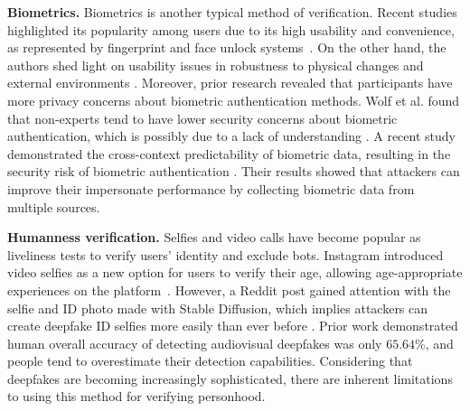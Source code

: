 \textbf{Biometrics.}
Biometrics is another typical method of verification. Recent studies highlighted its popularity among users due to its high usability and convenience, as represented by fingerprint and face unlock systems~\cite{mare2016study, De-Luca2015-mp, Bhagavatula2015-fi, Zimmermann2017-wr}. %
On the other hand, the authors shed light on usability issues in robustness to physical changes %
and external environments %
\cite{mare2016study, Bhagavatula2015-fi}. Moreover, prior research revealed that participants have more privacy concerns about biometric authentication methods\cite{Zimmermann2017-wr}. %
Wolf et al. found that non-experts tend to have lower security concerns about biometric authentication, which is possibly due to a lack of understanding \cite{Wolf2019-od}. A recent study demonstrated the cross-context predictability of biometric data, resulting in the security risk of biometric authentication \cite{Eberz2018-eg}. Their results showed that attackers can improve their impersonate performance by collecting biometric data from multiple sources. 

\textbf{Humanness verification.}
Selfies and video calls have become popular %
as liveliness tests to verify users' identity and exclude bots. 
Instagram introduced video selfies as a new option for users to verify their age, allowing age-appropriate experiences on the platform~\cite{instagramWaysVerify}. However, 
a Reddit post gained attention with the selfie and ID photo made with Stable Diffusion, which implies attackers can create deepfake ID selfies more easily than ever before \cite{techcrunchGenAICould}. Prior work \cite{hashmi2024unmasking} demonstrated human overall accuracy of detecting audiovisual deepfakes was only $65.64$\%, and people tend to overestimate their detection capabilities. Considering that deepfakes are becoming increasingly sophisticated, there are inherent limitations to using this method for verifying personhood.

